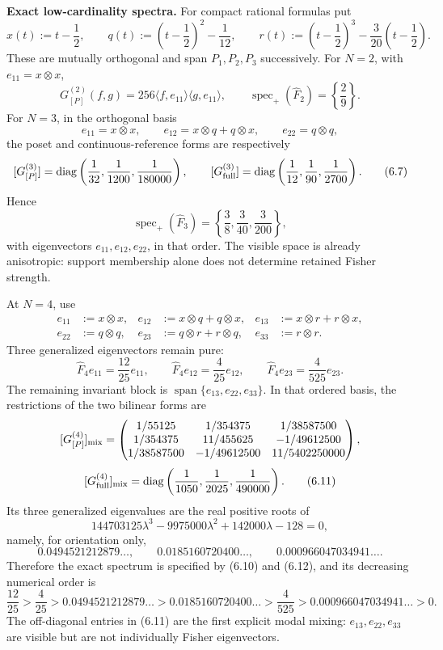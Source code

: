 \documentclass[11pt]{article}
\begin{document}
\textbf{Exact low-cardinality spectra.} For compact rational formulas put \[ x(t):=t-\frac12,\qquad q(t):=\left(t-\frac12\right)^2-\frac1{12},\qquad r(t):=\left(t-\frac12\right)^3       -\frac3{20}\left(t-\frac12\right). \tag{6.5} \] These are mutually orthogonal and span \(P_1,P_2,P_3\) successively. For \(N=2\), with \(e_{11}=x\otimes x\), \[ G_{[P]}^{(2)}(f,g) =256\langle f,e_{11}\rangle\langle g,e_{11}\rangle, \qquad \operatorname{spec}_+(\widehat F_2)=\left\{\frac29\right\}. \tag{6.6} \] For \(N=3\), in the orthogonal basis \[ e_{11}=x\otimes x,\qquad e_{12}=x\otimes q+q\otimes x,\qquad e_{22}=q\otimes q, \] the poset and continuous-reference forms are respectively \[ [G_{[P]}^{(3)}] =\operatorname{diag}\left(\frac1{32},\frac1{1200}, \frac1{180000}\right), \qquad [G_{\rm full}^{(3)}] =\operatorname{diag}\left(\frac1{12},\frac1{90}, \frac1{2700}\right). \tag{6.7} \] Hence \[ \boxed{ \operatorname{spec}_+(\widehat F_3) =\left\{\frac38,\frac3{40},\frac3{200}\right\},} \tag{6.8} \] with eigenvectors \(e_{11},e_{12},e_{22}\), in that order. The visible space is already anisotropic: support membership alone does not determine retained Fisher strength.

At \(N=4\), use \[ \begin{aligned} e_{11}&:=x\otimes x,& e_{12}&:=x\otimes q+q\otimes x,& e_{13}&:=x\otimes r+r\otimes x,\\ e_{22}&:=q\otimes q,& e_{23}&:=q\otimes r+r\otimes q,& e_{33}&:=r\otimes r. \end{aligned} \tag{6.9} \] Three generalized eigenvectors remain pure: \[ \widehat F_4e_{11}=\frac{12}{25}e_{11}, \qquad \widehat F_4e_{12}=\frac4{25}e_{12}, \qquad \widehat F_4e_{23}=\frac4{525}e_{23}. \tag{6.10} \] The remaining invariant block is \(\operatorname{span}\{e_{13},e_{22},e_{33}\}\). In that ordered basis, the restrictions of the two bilinear forms are \[ [G_{[P]}^{(4)}]_{\rm mix} =\begin{pmatrix} 1/55125&1/354375&1/38587500\\ 1/354375&11/455625&-1/49612500\\ 1/38587500&-1/49612500&11/5402250000 \end{pmatrix}, \] \[ [G_{\rm full}^{(4)}]_{\rm mix} =\operatorname{diag}\left(\frac1{1050},\frac1{2025}, \frac1{490000}\right). \tag{6.11} \] Its three generalized eigenvalues are the real positive roots of \[ 144703125\lambda^3-9975000\lambda^2+142000\lambda-128=0, \tag{6.12} \] namely, for orientation only, \[ 0.0494521212879\ldots,\qquad 0.0185160720400\ldots,\qquad 0.000966047034941\ldots. \] Therefore the exact spectrum is specified by (6.10) and (6.12), and its decreasing numerical order is \[ \frac{12}{25}>\frac4{25}>0.0494521212879\ldots> 0.0185160720400\ldots>\frac4{525}> 0.000966047034941\ldots>0. \tag{6.13} \] The off-diagonal entries in (6.11) are the first explicit modal mixing: \(e_{13},e_{22},e_{33}\) are visible but are not individually Fisher eigenvectors.
\end{document}
